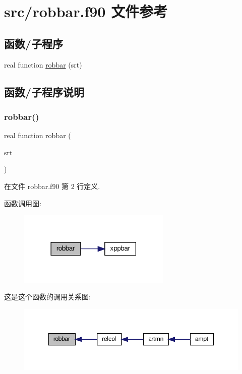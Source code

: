 \hypertarget{robbar_8f90}{}\section{src/robbar.f90 文件参考}
\label{robbar_8f90}
\subsection*{函数/子程序}
\begin{DoxyCompactItemize}
\item 
real function \mbox{\hyperlink{robbar_8f90_af5be24100c87ba6ca54bc45e6c2f1bf2}{robbar}} (srt)
\end{DoxyCompactItemize}


\subsection{函数/子程序说明}
\mbox{\label{robbar_8f90_af5be24100c87ba6ca54bc45e6c2f1bf2}} 
\subsubsection{\texorpdfstring{robbar()}{robbar()}}
{\footnotesize\ttfamily real function robbar (\begin{DoxyParamCaption}\item[{}]{srt }\end{DoxyParamCaption})}



在文件 robbar.\+f90 第 2 行定义.

函数调用图\+:
\nopagebreak
\begin{figure}[H]
\begin{center}
\leavevmode
\includegraphics[width=206pt]{robbar_8f90_af5be24100c87ba6ca54bc45e6c2f1bf2_cgraph}
\end{center}
\end{figure}
这是这个函数的调用关系图\+:
\nopagebreak
\begin{figure}[H]
\begin{center}
\leavevmode
\includegraphics[width=350pt]{robbar_8f90_af5be24100c87ba6ca54bc45e6c2f1bf2_icgraph}
\end{center}
\end{figure}
